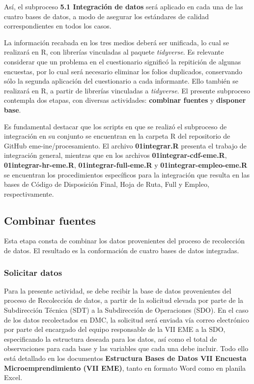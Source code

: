 \documentclass[
]{article}
\begin{document}
Así, el subproceso \textbf{5.1 Integración de datos} será aplicado en cada una de las cuatro bases de datos, a modo de asegurar los estándares de calidad correspondientes en todos los casos.

La información recabada en los tres medios deberá ser unificada, lo cual se realizará en R, con librerías vinculadas al paquete \emph{tidyverse}. Es relevante considerar que un problema en el cuestionario significó la repitición de algunas encuestas, por lo cual será necesario eliminar los folios duplicados, conservando sólo la segunda aplicación del cuestionario a cada informante. Ello también se realizará en R, a partir de librerías vinculadas a \emph{tidyverse}. El presente subproceso contempla dos etapas, con diversas actividades: \textbf{combinar fuentes} y \textbf{disponer base}.

Es fundamental destacar que los scripts en que se realizó el subproceso de integración en su conjunto se encuentran en la carpeta R del repositorio de GitHub eme-ine/procesamiento. El archivo \textbf{01integrar.R} presenta el trabajo de integración general, mientras que en los archivos \textbf{01integrar-cdf-eme.R}, \textbf{01integrar-hr-eme.R}, \textbf{01integrar-full-eme.R} y \textbf{01integrar-empleo-eme.R} se encuentran los procedimientos específicos para la integración que resulta en las bases de Código de Disposición Final, Hoja de Ruta, Full y Empleo, respectivamente.

\hypertarget{combinar-fuentes}{%
\subsection{Combinar fuentes}\label{combinar-fuentes}}

Esta etapa consta de combinar los datos provenientes del proceso de recolección de datos. El resultado es la conformación de cuatro bases de datos integradas.

\hypertarget{solicitar-datos}{%
\subsubsection{Solicitar datos}\label{solicitar-datos}}

Para la presente actividad, se debe recibir la base de datos provenientes del proceso de Recolección de datos, a partir de la solicitud elevada por parte de la Subdirección Técnica (SDT) a la Subdirección de Operaciones (SDO). En el caso de los datos recolectados en DMC, la solicitud será enviada vía correo electrónico por parte del encargado del equipo responsable de la VII EME a la SDO, especificando la estructura deseada para los datos, así como el total de observaciones para cada base y las variables que cada una debe incluir. Todo ello está detallado en los documentos \textbf{Estructura Bases de Datos VII Encuesta Microemprendimiento (VII EME)}, tanto en formato Word como en planila Excel.
\end{document}
